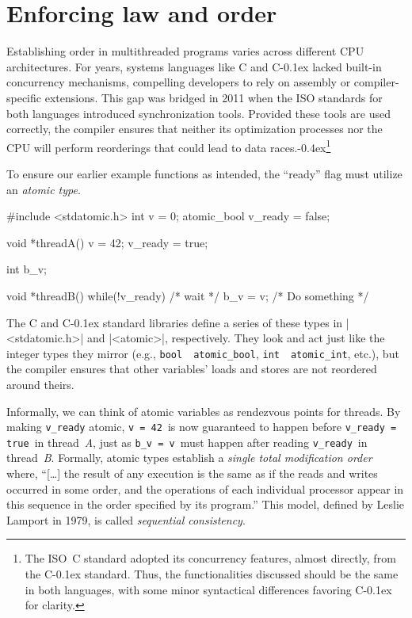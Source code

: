 \documentclass[fontsize=10pt, oneside]{scrartcl}
\newcommand{\punckern}{\kern-0.4ex}
\newcommand{\monobox}[1]{\mbox{\texttt{#1}}}
\newcommand{\cplusplus}[1]{C\kern-0.1ex\raisebox{0.15ex}{\texttt{++}}}
\newcommand{\clang}[1]{C}
\newcommand{\introduce}[1]{\textit{#1}}
\begin{document}
\section{Enforcing law and order}
\label{seqcst}

Establishing order in multithreaded programs varies across different \textsc{CPU} architectures.
For years, systems languages like \clang{} and \cplusplus{} lacked built-in concurrency mechanisms,
compelling developers to rely on assembly or compiler-specific extensions.
This gap was bridged in 2011 when the \textsc{ISO} standards for both languages introduced synchronization tools.
Provided these tools are used correctly,
the compiler ensures that neither its optimization processes nor the \textsc{CPU} will perform reorderings that could lead to data races.\punckern\footnote{%
The ISO~\clang{11} standard adopted its concurrency features,
almost directly, from the \cplusplus{11} standard.
Thus, the functionalities discussed should be the same in both languages,
with some minor syntactical differences favoring \cplusplus{} for clarity.
}

To ensure our earlier example functions as intended,
the ``ready'' flag must utilize an \introduce{atomic type}.
\begin{ccode}
#include <stdatomic.h>
int v = 0;
atomic_bool v_ready = false;

void *threadA()
{
    v = 42;
    v_ready = true;
}
\end{ccode}
\begin{ccode}
int b_v;

void *threadB()
{
    while(!v_ready) { /* wait */ }
    b_v = v;
    /* Do something */
}
\end{ccode}
The \clang{} and \cplusplus{} standard libraries define a series of these types in \cc|<stdatomic.h>| and \cpp|<atomic>|,
respectively.
They look and act just like the integer types they mirror (e.g., \monobox{bool}~\textrightarrow~\monobox{atomic\_bool},
\monobox{int}~\textrightarrow~\monobox{atomic\_int}, etc.),
but the compiler ensures that other variables' loads and stores are not reordered around theirs.

Informally, we can think of atomic variables as rendezvous points for threads.
By making \monobox{v\_ready} atomic,
\monobox{v = 42}\, is now guaranteed to happen before \monobox{v\_ready = true}\, in thread~\textit{A},
just as \monobox{b\_v = v}\, must happen after reading \monobox{v\_ready}\,
in thread~\textit{B}.
Formally, atomic types establish a \textit{single total modification order} where,
``[\ldots] the result of any execution is the same as if the reads and writes occurred in some order, and the operations of each individual processor appear in this sequence in the order specified by its program.''
This model, defined by Leslie Lamport in 1979,
is called \introduce{sequential consistency}.
\end{document}
